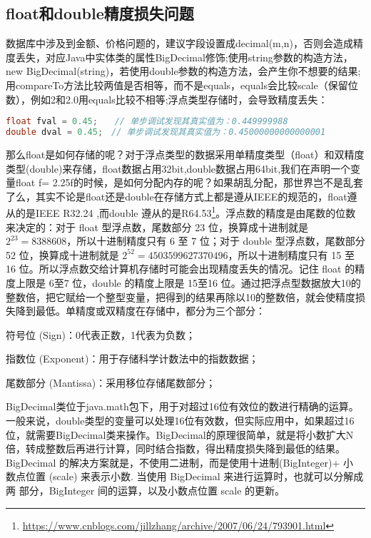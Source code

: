 \documentclass[../../../interview-questions.tex]{subfiles}
\begin{document}
\subsection{float和double精度损失问题}

数据库中涉及到金额、价格问题的，建议字段设置成decimal(m,n)，否则会造成精度丢失，对应Java中实体类的属性BigDecimal修饰;使用string参数的构造方法，new  BigDecimal(string)，若使用double参数的构造方法，会产生你不想要的结果;用compareTo方法比较两值是否相等，而不是equals，equals会比较scale（保留位数），例如2和2.0用equals比较不相等;浮点类型存储时，会导致精度丢失：

\begin{lstlisting}[language=Java]
float fval = 0.45;　　// 单步调试发现其真实值为：0.449999988
double dval = 0.45;　// 单步调试发现其真实值为：0.45000000000000001
\end{lstlisting}

那么float是如何存储的呢？对于浮点类型的数据采用单精度类型（float）和双精度类型(double)来存储，float数据占用32bit,double数据占用64bit,我们在声明一个变量float f= 2.25f的时候，是如何分配内存的呢？如果胡乱分配，那世界岂不是乱套了么，其实不论是float还是double在存储方式上都是遵从IEEE的规范的，float遵从的是IEEE R32.24 ,而double 遵从的是R64.53\footnote{\url{https://www.cnblogs.com/jillzhang/archive/2007/06/24/793901.html}}。浮点数的精度是由尾数的位数来决定的：对于 float 型浮点数，尾数部分 23 位，换算成十进制就是 $2^{23}=8388608$，所以十进制精度只有 6 至 7 位；对于 double 型浮点数，尾数部分 52 位，换算成十进制就是 $2^{52} = 4503599627370496$，所以十进制精度只有 15 至 16 位。所以浮点数交给计算机存储时可能会出现精度丢失的情况。记住 float 的精度上限是 6至7 位，double 的精度上限是 15至16 位。通过把浮点型数据放大10的整数倍，把它赋给一个整型变量，把得到的结果再除以10的整数倍，就会使精度损失降到最低。单精度或双精度在存储中，都分为三个部分：

符号位 (Sign)：0代表正数，1代表为负数；

指数位 (Exponent)：用于存储科学计数法中的指数数据；

尾数部分 (Mantissa)：采用移位存储尾数部分；

BigDecimal类位于java.math包下，用于对超过16位有效位的数进行精确的运算。一般来说，double类型的变量可以处理16位有效数，但实际应用中，如果超过16位，就需要BigDecimal类来操作。BigDecimal的原理很简单，就是将小数扩大N倍，转成整数后再进行计算，同时结合指数，得出精度损失降到最低的结果。BigDecimal 的解决方案就是，不使用二进制，而是使用十进制(BigInteger)+ 小
数点位置 (scale) 来表示小数. 当使用 BigDecimal 来进行运算时，也就可以分解成两 部分，BigInteger 间的运算，以及小数点位置 scale 的更新。
\end{document}
